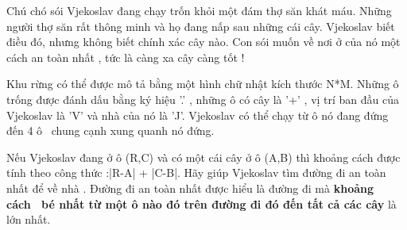 Chú chó sói Vjekoslav đang chạy trốn khỏi một đám thợ săn khát máu. Những người thợ săn rất thông minh và họ đang nấp sau những cái cây. Vjekoslav biết điều đó, nhưng không biết chính xác cây nào. Con sói muốn về nơi ở của nó một cách an toàn nhất , tức là càng xa cây càng tốt !  

   Khu rừng có thể được mô tả bằng một hình chữ nhật kích thước N*M. Những ô trống được đánh dấu bằng ký hiệu '.' , những ô có cây là '+' , vị trí ban đầu của Vjekoslav là 'V' và nhà của nó là 'J'. Vjekoslav có thể chạy từ ô nó đang đứng đến 4 ô  chung cạnh xung quanh nó đứng.  

   Nếu Vjekoslav đang ở ô (R,C) và có một cái cây ở ô (A,B) thì khoảng cách được tính theo công thức :|R-A| + |C-B|. Hãy giúp Vjekoslav tìm đường đi an toàn nhất để về nhà . Đường đi an toàn nhất được hiểu là đường đi mà   \textbf{    khoảng cách  bé nhất từ một ô nào đó trên đường đi đó đến tất cả các cây   }   là lớn nhất.  

\